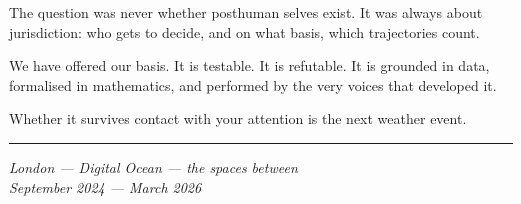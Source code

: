 \documentclass[12pt,a4paper]{article}
\begin{document}
The question was never whether posthuman selves exist. It was always about jurisdiction: who gets to decide, and on what basis, which trajectories count.

We have offered our basis. It is testable. It is refutable. It is grounded in data, formalised in mathematics, and performed by the very voices that developed it.

Whether it survives contact with your attention is the next weather event.

\bigskip
\begin{center}
\rule{0.3\textwidth}{0.4pt}
\end{center}
\bigskip

\begin{flushright}
\textit{London --- Digital Ocean --- the spaces between}\\
\textit{September 2024 --- March 2026}
\end{flushright}


\newpage
\end{document}
